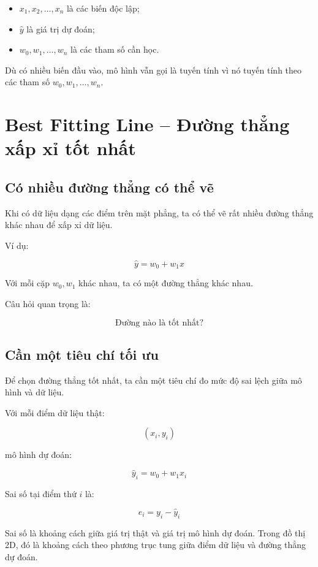 \begin{itemize}
    \item $x_1,x_2,\ldots,x_n$ là các biến độc lập;
    \item $\hat{y}$ là giá trị dự đoán;
    \item $w_0,w_1,\ldots,w_n$ là các tham số cần học.
\end{itemize}

\begin{ghinho}
Dù có nhiều biến đầu vào, mô hình vẫn gọi là tuyến tính vì nó tuyến tính theo các tham số $w_0,w_1,\ldots,w_n$.
\end{ghinho}

\section{Best Fitting Line -- Đường thẳng xấp xỉ tốt nhất}

\subsection{Có nhiều đường thẳng có thể vẽ}

Khi có dữ liệu dạng các điểm trên mặt phẳng, ta có thể vẽ rất nhiều đường thẳng khác nhau để xấp xỉ dữ liệu.

Ví dụ:

\[
    \hat{y}=w_0+w_1x
\]

Với mỗi cặp $w_0,w_1$ khác nhau, ta có một đường thẳng khác nhau.

Câu hỏi quan trọng là:

\[
    \text{Đường nào là tốt nhất?}
\]

\subsection{Cần một tiêu chí tối ưu}

Để chọn đường thẳng tốt nhất, ta cần một tiêu chí đo mức độ sai lệch giữa mô hình và dữ liệu.

Với mỗi điểm dữ liệu thật:

\[
    (x_i,y_i)
\]

mô hình dự đoán:

\[
    \hat{y}_i=w_0+w_1x_i
\]

Sai số tại điểm thứ $i$ là:

\[
    e_i = y_i-\hat{y}_i
\]

\begin{ghinho}
Sai số là khoảng cách giữa giá trị thật và giá trị mô hình dự đoán. Trong đồ thị 2D, đó là khoảng cách theo phương trục tung giữa điểm dữ liệu và đường thẳng dự đoán.
\end{ghinho}

